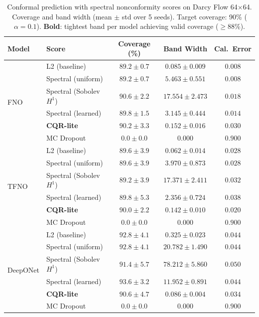 \begin{table}[t]
\centering
\caption{Conformal prediction with spectral nonconformity scores on Darcy Flow 64$\times$64.
Coverage and band width (mean $\pm$ std over 5 seeds). Target coverage: 90\% ($\alpha=0.1$).
\textbf{Bold}: tightest band per model achieving valid coverage ($\geq$88\%).}
\label{tab:main}
\small
\begin{tabular}{llccc}
\toprule
\textbf{Model} & \textbf{Score} & \textbf{Coverage (\%)} & \textbf{Band Width} & \textbf{Cal.\ Error} \\
\midrule
\multirow{6}{*}{FNO}
  & L2 (baseline)         & $89.2 \pm 0.7$ & $0.085 \pm 0.009$ & $0.008$ \\
  & Spectral (uniform)    & $89.2 \pm 0.7$ & $5.463 \pm 0.551$ & $0.008$ \\
  & Spectral (Sobolev $H^1$) & $90.6 \pm 2.2$ & $17.554 \pm 2.473$ & $0.018$ \\
  & Spectral (learned)    & $89.8 \pm 1.5$ & $3.145 \pm 0.444$ & $0.014$ \\
  & \textbf{CQR-lite}     & $\mathbf{90.2 \pm 3.3}$ & $\mathbf{0.152 \pm 0.016}$ & $0.030$ \\
  & MC Dropout            & $0.0 \pm 0.0$ & $0.000$ & $0.900$ \\
\midrule
\multirow{6}{*}{TFNO}
  & L2 (baseline)         & $89.6 \pm 3.9$ & $0.062 \pm 0.014$ & $0.028$ \\
  & Spectral (uniform)    & $89.6 \pm 3.9$ & $3.970 \pm 0.873$ & $0.028$ \\
  & Spectral (Sobolev $H^1$) & $89.2 \pm 3.9$ & $17.371 \pm 2.411$ & $0.032$ \\
  & Spectral (learned)    & $89.8 \pm 5.3$ & $2.356 \pm 0.724$ & $0.038$ \\
  & \textbf{CQR-lite}     & $\mathbf{90.0 \pm 2.2}$ & $\mathbf{0.142 \pm 0.010}$ & $0.020$ \\
  & MC Dropout            & $0.0 \pm 0.0$ & $0.000$ & $0.900$ \\
\midrule
\multirow{6}{*}{DeepONet}
  & L2 (baseline)         & $92.8 \pm 4.1$ & $0.325 \pm 0.023$ & $0.044$ \\
  & Spectral (uniform)    & $92.8 \pm 4.1$ & $20.782 \pm 1.490$ & $0.044$ \\
  & Spectral (Sobolev $H^1$) & $91.4 \pm 5.7$ & $78.212 \pm 5.860$ & $0.050$ \\
  & Spectral (learned)    & $93.6 \pm 3.2$ & $11.952 \pm 0.891$ & $0.044$ \\
  & \textbf{CQR-lite}     & $\mathbf{90.6 \pm 4.7}$ & $\mathbf{0.086 \pm 0.004}$ & $0.034$ \\
  & MC Dropout            & $0.0 \pm 0.0$ & $0.000$ & $0.900$ \\
\bottomrule
\end{tabular}
\end{table}



